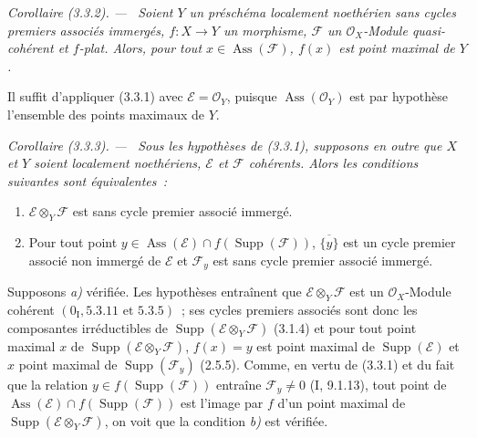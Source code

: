 \documentclass[10pt,oneside]{book}
\newcommand{\oldpage}[2][]{%
  \setcounter{footnote}{0}%
  \marginpar{\scriptsize\textbf{#1}~|~#2}\ignorespaces}
\newenvironment{corollary}[1][]{%
  \par\medskip\noindent\itshape Corollaire (#1). ---\ }{\par}
\begin{document}
\begin{corollary}[3.3.2]
\label{IV.2.3.3.2-fr}
Soient $Y$ un préschéma localement noethérien sans cycles premiers associés
immergés, $f:X\to Y$ un morphisme, $\mathcal F$ un $\mathcal O_X$-Module
quasi-cohérent et $f$-plat. Alors, pour tout
$x\in\operatorname{Ass}(\mathcal F)$, $f(x)$ est point maximal de $Y$.
\end{corollary}

Il suffit d'appliquer (3.3.1) avec $\mathcal E=\mathcal O_Y$, puisque
$\operatorname{Ass}(\mathcal O_Y)$ est par hypothèse l'ensemble des points
maximaux de $Y$.

\begin{corollary}[3.3.3]
\label{IV.2.3.3.3-fr}
Sous les hypothèses de (3.3.1), supposons en outre que $X$ et $Y$ soient
localement noethériens, $\mathcal E$ et $\mathcal F$ cohérents. Alors les
conditions suivantes sont équivalentes~:
\begin{enumerate}
\item[\emph{a)}] $\mathcal E\otimes_Y\mathcal F$ est sans cycle premier
associé immergé.
\item[\emph{b)}] Pour tout point
$y\in\operatorname{Ass}(\mathcal E)\cap f(\operatorname{Supp}(\mathcal F))$,
$\overline{\{y\}}$ est un cycle premier associé non immergé de $\mathcal E$ et
$\mathcal F_y$ est sans cycle premier associé immergé.
\end{enumerate}
\end{corollary}

\oldpage[IV-2]{44}
Supposons \emph{a)} vérifiée. Les hypothèses entraînent que
$\mathcal E\otimes_Y\mathcal F$ est un $\mathcal O_X$-Module cohérent
$(0_{\mathrm I},5.3.11\text{ et }5.3.5)$~; ses cycles premiers associés sont
donc les composantes irréductibles de
$\operatorname{Supp}(\mathcal E\otimes_Y\mathcal F)$ (3.1.4) et pour tout
point maximal $x$ de $\operatorname{Supp}(\mathcal E\otimes_Y\mathcal F)$,
$f(x)=y$ est point maximal de $\operatorname{Supp}(\mathcal E)$ et $x$ point
maximal de $\operatorname{Supp}(\mathcal F_y)$ (2.5.5). Comme, en vertu de
(3.3.1) et du fait que la relation
$y\in f(\operatorname{Supp}(\mathcal F))$ entraîne $\mathcal F_y\ne0$
(I, 9.1.13), tout point de
$\operatorname{Ass}(\mathcal E)\cap f(\operatorname{Supp}(\mathcal F))$ est
l'image par $f$ d'un point maximal de
$\operatorname{Supp}(\mathcal E\otimes_Y\mathcal F)$, on voit que la condition
\emph{b)} est vérifiée.
\end{document}
